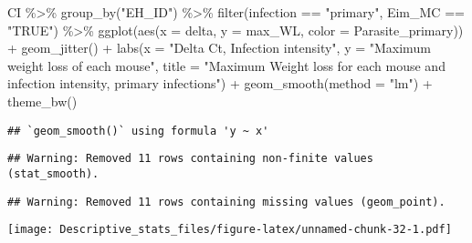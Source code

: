\documentclass[
]{article}
\newenvironment{Shaded}{\begin{snugshade}}{\end{snugshade}}
\newcommand{\AttributeTok}[1]{\textcolor[rgb]{0.77,0.63,0.00}{#1}}
\newcommand{\FunctionTok}[1]{\textcolor[rgb]{0.00,0.00,0.00}{#1}}
\newcommand{\NormalTok}[1]{#1}
\newcommand{\SpecialCharTok}[1]{\textcolor[rgb]{0.00,0.00,0.00}{#1}}
\newcommand{\StringTok}[1]{\textcolor[rgb]{0.31,0.60,0.02}{#1}}
\begin{document}
\begin{Shaded}
\begin{Highlighting}[]
\NormalTok{CI  }\SpecialCharTok{\%\textgreater{}\%}
  \FunctionTok{group\_by}\NormalTok{(}\StringTok{"EH\_ID"}\NormalTok{) }\SpecialCharTok{\%\textgreater{}\%}
  \FunctionTok{filter}\NormalTok{(infection }\SpecialCharTok{==} \StringTok{"primary"}\NormalTok{, Eim\_MC }\SpecialCharTok{==} \StringTok{"TRUE"}\NormalTok{) }\SpecialCharTok{\%\textgreater{}\%}
  \FunctionTok{ggplot}\NormalTok{(}\FunctionTok{aes}\NormalTok{(}\AttributeTok{x =}\NormalTok{ delta, }\AttributeTok{y =}\NormalTok{ max\_WL, }\AttributeTok{color =}\NormalTok{ Parasite\_primary)) }\SpecialCharTok{+}
  \FunctionTok{geom\_jitter}\NormalTok{() }\SpecialCharTok{+}
  \FunctionTok{labs}\NormalTok{(}\AttributeTok{x =} \StringTok{"Delta Ct, Infection intensity"}\NormalTok{, }\AttributeTok{y =} \StringTok{"Maximum weight loss of each mouse"}\NormalTok{,}
       \AttributeTok{title =} \StringTok{"Maximum Weight loss for each mouse and infection intensity, }
\StringTok{       primary infections"}\NormalTok{) }\SpecialCharTok{+}
    \FunctionTok{geom\_smooth}\NormalTok{(}\AttributeTok{method =} \StringTok{"lm"}\NormalTok{) }\SpecialCharTok{+}
    \FunctionTok{theme\_bw}\NormalTok{()}
\end{Highlighting}
\end{Shaded}

\begin{verbatim}
## `geom_smooth()` using formula 'y ~ x'
\end{verbatim}

\begin{verbatim}
## Warning: Removed 11 rows containing non-finite values (stat_smooth).
\end{verbatim}

\begin{verbatim}
## Warning: Removed 11 rows containing missing values (geom_point).
\end{verbatim}

\texttt{[image: Descriptive\_stats\_files/figure-latex/unnamed-chunk-32-1.pdf]}
\end{document}
